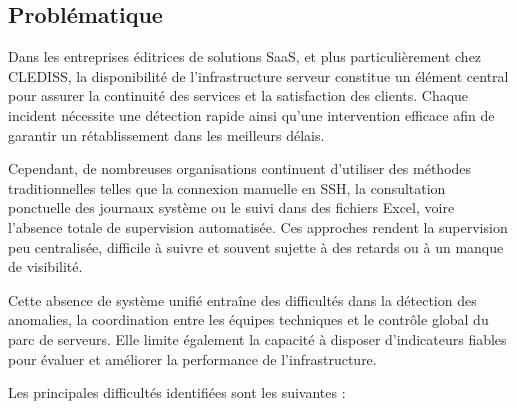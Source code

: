 \subsection{Problématique}
Dans les entreprises éditrices de solutions SaaS, et plus particulièrement chez
CLEDISS, la disponibilité de l'infrastructure serveur constitue un élément central pour
assurer la continuité des services et la satisfaction des clients. Chaque incident
nécessite une détection rapide ainsi qu'une intervention efficace afin de garantir un
rétablissement dans les meilleurs délais.

Cependant, de nombreuses organisations continuent d'utiliser des méthodes
traditionnelles telles que la connexion manuelle en SSH, la consultation ponctuelle des
journaux système ou le suivi dans des fichiers Excel, voire l'absence totale de
supervision automatisée. Ces approches rendent la supervision peu centralisée, difficile
à suivre et souvent sujette à des retards ou à un manque de visibilité.

Cette absence de système unifié entraîne des difficultés dans la détection des
anomalies, la coordination entre les équipes techniques et le contrôle global du parc de
serveurs. Elle limite également la capacité à disposer d'indicateurs fiables pour
évaluer et améliorer la performance de l'infrastructure.

Les principales difficultés identifiées sont les suivantes :

